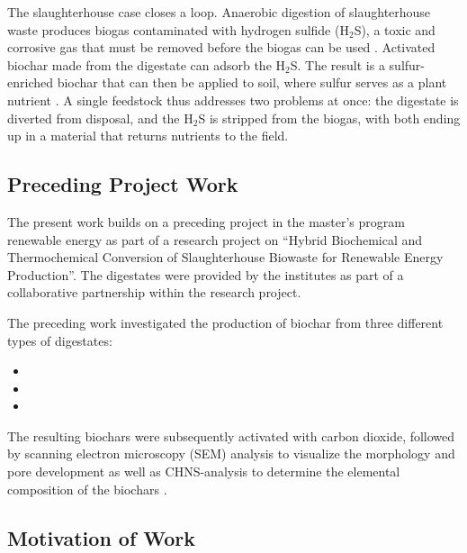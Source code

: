 \vspace{0.3em}

The slaughterhouse case closes a loop. Anaerobic digestion of slaughterhouse waste produces biogas contaminated with hydrogen sulfide (H$_2$S), a toxic and corrosive gas that must be removed before the biogas can be used \parencite{salminen-2002}. Activated biochar made from the digestate can adsorb the H$_2$S. The result is a sulfur-enriched biochar that can then be applied to soil, where sulfur serves as a plant nutrient \parencite{Zhang2017SulfurEnrichedBiochar}. A single feedstock thus addresses two problems at once: the digestate is diverted from disposal, and the H$_2$S is stripped from the biogas, with both ending up in a material that returns nutrients to the field.

\subsection{Preceding Project Work}
The present work builds on a preceding project in the master's program renewable energy as part of a research project on “Hybrid Biochemical and Thermochemical Conversion of Slaughterhouse Biowaste for Renewable Energy Production”. The digestates were provided by the institutes as part of a collaborative partnership within the research project.

\vspace{0.3em}

The preceding work investigated the production of biochar from three different types of digestates:

\begin{itemize}
    \item {} 
    \item {}
    \item {}
\end{itemize}

The resulting biochars were subsequently activated with carbon dioxide, followed by  scanning electron microscopy (SEM) analysis to visualize the morphology and pore development as well as CHNS-analysis to determine the elemental composition of the biochars \parencite{MartinezHuete2024Projektarbeit}. 

\subsection{Motivation of Work}

